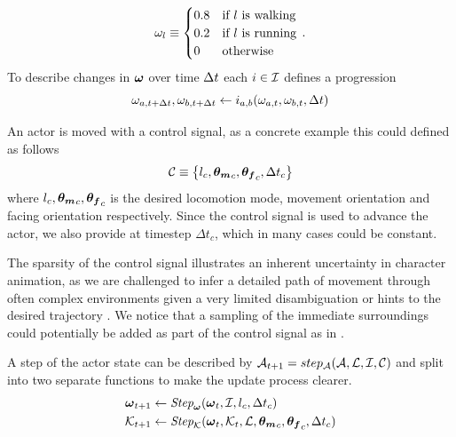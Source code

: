 \begin{equation}
    \label{eq:contribusion:weight:example}
    \omega_l \equiv
    \begin{cases}
    0.8 & \text{if $l$ is walking} \\
    0.2 & \text{if $l$ is running} \\
    0 & \text{otherwise}
    \end{cases}\,.
\end{equation}
To describe changes in $\boldsymbol{\omega }$ over time $\Delta{t}$ each $i \in \mathcal{I}$ defines a progression
\begin{equation}
\omega_{a,t+\Delta{t}},\omega_{b,t+\Delta{t}}\leftarrow i_{a,b}(\omega_{a,t},\omega_{b,t}, \Delta{t})
\end{equation}

An actor is moved with a control signal, as a concrete example this could defined as follows
\begin{equation}
    \label{eq:control:signal:def}
    \mathcal{C} \equiv \left\{ 
    l_c, \boldsymbol{\theta_m }_c, {\boldsymbol{\theta_f }}_c, \Delta{t}_c \right\}
\end{equation}
where $l_c, \boldsymbol{\theta_m }_c, {\boldsymbol{\theta_f }}_c$ is the desired locomotion mode, movement orientation and facing orientation respectively. Since the control signal is used to advance the actor, we also provide at timestep $\Delta{t}_c$, which in many cases could be constant.

The sparsity of the control signal illustrates an inherent uncertainty in character animation, as we are challenged to infer a detailed path of movement through often complex environments given a very limited disambiguation or hints to the desired trajectory \cite{holden.ea16}. We notice that a sampling of the immediate surroundings could potentially be added as part of the control signal as in \cite{holden.ea17}. 

A step of the actor state can be described by $\mathcal{A}_{t+1} = step_{\mathcal{A}}(\mathcal{A}, \mathcal{L}, \mathcal{I}, \mathcal{C})$ and split into two separate functions to make the update process clearer.
\begin{subequations}
\begin{align}
    \boldsymbol{\omega }_{t+1} &\leftarrow \textit{Step}_{\boldsymbol{\omega }}( \boldsymbol{\omega }_{t}, \mathcal{I}, l_c, \Delta{t}_c) \label{eq:step:interpolators}\\
    \mathcal{K}_{t+1} &\leftarrow  \textit{Step}_{\mathcal{K}}(\boldsymbol{\omega }_t, \mathcal{K}_{t},  \mathcal{L}, {\boldsymbol{\theta_m }}_c, {\boldsymbol{\theta_f }}_c, \Delta{t}_c )\label{eq:step:kinematics}
\end{align}
\end{subequations}

